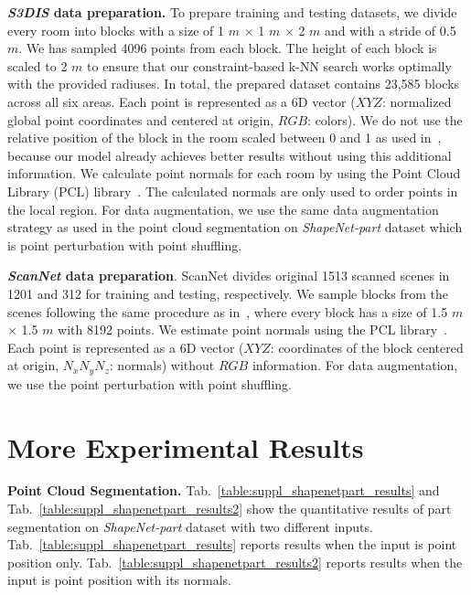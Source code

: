 \documentclass[10pt,twocolumn,letterpaper]{article}
\begin{document}
\textbf{\emph{S3DIS} data preparation.} To prepare training and testing datasets, we divide every room into blocks with a size of 1 $m$ $\times$ 1 $m$ $\times$ 2 $m$ and with a stride of 0.5 $m$. We has sampled 4096 points from each block. The height of each block is scaled to 2 $m$ to ensure that our constraint-based k-NN search works optimally with the provided radiuses. In total, the prepared dataset contains 23,585 blocks across all six areas. Each point is represented as a 6D vector ($XYZ$: normalized global point coordinates and centered at origin, $RGB$: colors). We do not use the relative position of the block in the room scaled between 0 and 1 as used in~\cite{qi2017pointnet}, because our model already achieves better results without using this additional information. We calculate point normals for each room by using the Point Cloud Library (PCL) library~\cite{rusu20113d}. The calculated normals are only used to order points in the local region. For data augmentation, we use the same data augmentation strategy as used in the point cloud segmentation on \emph{ShapeNet-part} dataset which is point perturbation with point shuffling.

\textbf{\emph{ScanNet} data preparation}. ScanNet divides original 1513 scanned scenes in 1201 and 312 for training and testing, respectively. We sample blocks from the scenes following the same procedure as in~\cite{qi2017pointnet++}, where every block has a size of 1.5 $m$ $\times$ 1.5 $m$ with 8192 points. We estimate point normals using the PCL library~\cite{rusu20113d}. Each point is represented as a 6D vector ($XYZ$: coordinates of the block centered at origin, $N_xN_yN_z$: normals) without $RGB$ information. For data augmentation, we use the point perturbation with point shuffling.

\section{More Experimental Results}
\label{sec:suppl_more_experimental_results} 
\textbf{Point Cloud Segmentation. }Tab.~\ref{table:suppl_shapenetpart_results} and Tab.~\ref{table:suppl_shapenetpart_results2} show the quantitative results of part segmentation on \emph{ShapeNet-part} dataset with two different inputs. Tab.~\ref{table:suppl_shapenetpart_results} reports results when the input is point position only. Tab.~\ref{table:suppl_shapenetpart_results2} reports results when the input is point position with its normals.
\end{document}
